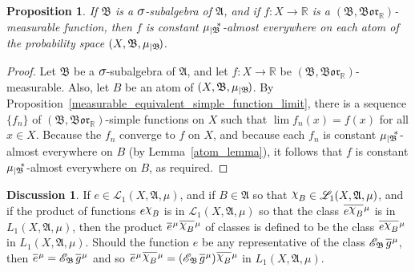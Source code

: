 \documentclass[
twoside=true,
paper=letter,
fontsize=9pt,
pagesize=auto,
leqno,
openany,
headsepline,
overfullrule,
]{scrbook}
\theoremstyle{plain}
\theoremstyle{plain}
\newtheorem{prop}[thm]{Proposition}
\theoremstyle{definition}
\newtheorem{discussion}[thm]{Discussion}
\theoremstyle{bfnoteitalic}
\theoremstyle{bfnoteroman}
\newcommand{\sigalg}[1]{\mathfrak{#1}}
\newcommand{\cali}[1]{\mathscr{#1}}
\newcommand{\condexpsub}[2]
{\mathop{\cali{E}\hspace{-1.5pt}}\nolimits_{#2}\hspace{-1pt}#1}
\newcommand{\borel}{\mathfrak{Bor}}
\newcommand{\textsigma}{\hbox{\large{$\sigma$}}\kern-1pt}
\newcommand{\charfunction}[1]{{\raisebox{2pt}{$\chi$}}_{#1}}
\newcommand{\restrictedto}[1]{_{\lvert#1}\kern-1.5pt}
\newcommand{\R}{\mathbb{R}}
\newcommand{\sigmaalgebra}{\sigalg{A}}
\newcommand{\sigmaalgebraii}{\sigalg{B}}
\newcommand{\Psubstar}[1]{\measure\restrictedto{#1}\kern-2pt^*}
\newcommand{\sigalgb}{\sigmaalgebraii}
\newcommand{\function}{f}
\newcommand{\functionii}{g}
\newcommand{\measurespace}{X}
\newcommand{\mspaceelt}{x}
\newcommand{\measure}{\mu}
\newcommand*\xbar[1]{%
   \hbox{%
     \vbox{%
       \hrule height 0.4pt %
       \kern0.4ex%
       \hbox{%
         \ensuremath{#1}%
       }%
     }%
   }%
}
\newcommand{\lebclass}[1]{\hspace{.5pt}\xbar{#1}\hspace{0.5pt}}
\newcommand{\ellclass}[2]{\lebclass{#1}^{#2}}
\begin{document}
\begin{prop}\label{constant_on_the_atoms}
If $\sigmaalgebraii$ is a $\textsigma$-subalgebra of $\sigmaalgebra$, and if  $\function:\measurespace\to\R$ is a $(\sigmaalgebraii, \borel_\R)$\hyp{}measurable function, then $\function$ is constant $\Psubstar{\sigalgb}$-almost everywhere on each atom of 
the probability space
$(\measurespace, \sigmaalgebraii,\measure\restrictedto{\sigmaalgebraii})$. 
\end{prop}

\begin{proof}
Let $\sigmaalgebraii$ be a $\textsigma$-subalgebra of $\sigmaalgebra$, and let $\function:\measurespace\to\R$ be $(\sigmaalgebraii, \borel_\R)$\hyp{}measurable. Also, let $B$ be an atom of $(\measurespace, \sigmaalgebraii,\measure\restrictedto{\sigmaalgebraii})$.  By Proposition~\ref{measurable_equivalent_simple_function_limit}, there is a sequence $\{\function_n\}$ of $(\sigmaalgebraii, \borel_\R)$-simple functions on $\measurespace$ such that 
$\lim  \function_n(\mspaceelt) = \function(\mspaceelt)$ for all $\mspaceelt\in\measurespace$. Because the $\function_n$ converge to $\function$ on $\measurespace$, and because  each $\function_n$ is constant $\Psubstar{\sigalgb}$-almost everywhere on $B$ (by Lemma~\ref{atom_lemma}), it follows that $\function$ is constant $\Psubstar{\sigalgb}$-almost everywhere on $B$, as required.
\end{proof}



\begin{discussion}
If $e\in\cali{L}_1(\measurespace, \sigmaalgebra,\measure)$, and if $B\in\sigmaalgebra$ so that $\charfunction{B}\in\cali{L}_1(\measurespace, \sigmaalgebra,\measure)$, and if the product of functions
$e\charfunction{B}$ is in $\cali{L}_1(\measurespace, \sigmaalgebra,\measure)$
so that the class $\ellclass{e\charfunction{B}}{\measure}$ is in 
$L_1(\measurespace, \sigmaalgebra,\measure)$, then the product 
$\ellclass{e}{\measure}\ellclass{\charfunction{B}}{\measure}$ 
of classes is defined to be the class 
$\ellclass{e\charfunction{B}}{\measure}$ in 
$L_1(\measurespace, \sigmaalgebra,\measure)$.
Should the function $e$ be any representative of the class 
$\condexpsub{\ellclass{\functionii}{\measure}}{\sigmaalgebraii}$, 
then $\ellclass{e}{\measure} = \condexpsub{\ellclass{\functionii}{\measure}}{\sigmaalgebraii}$
and so  
$\ellclass{e}{\measure}\ellclass{\charfunction{B}}{\measure} 
=
(\condexpsub{\ellclass{\functionii}{\measure}}{\sigmaalgebraii})\ellclass{\charfunction{B}}{\measure}$ 
in $L_1(\measurespace, \sigmaalgebra,\measure)$.
\end{discussion}
\end{document}
